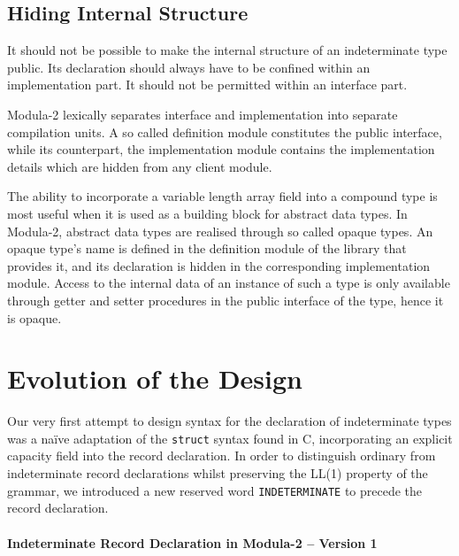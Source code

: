\documentclass[10pt,a4paper]{article}
\newcommand\sourcecaption[1]{\noindent\normalfont\small\textsf{#1}}
\begin{document}
\subsection{Hiding Internal Structure}

It should not be possible to make the internal structure of an indeterminate
type public. Its declaration should always have to be confined within an
implementation part. It should not be permitted within an interface part.\\

\par\noindent Modula-2 lexically separates interface and implementation into
separate compilation units. A so called definition module constitutes the
public interface, while its counterpart, the implementation module contains
the implementation details which are hidden from any client module.

The ability to incorporate a variable length array field into a compound
type is most useful when it is used as a building block for abstract
data types. In Modula-2, abstract data types are realised through so called
opaque types. An opaque type's name is defined in the definition module of
the library that provides it, and its declaration is hidden in the
corresponding implementation module. Access to the internal data of an
instance of such a type is only available through getter and setter
procedures in the public interface of the type, hence it is opaque.



\section{Evolution of the Design}

Our very first attempt to design syntax for the declaration of indeterminate
types was a na\"ive adaptation of the \verb|struct| syntax found in C,
incorporating an explicit capacity field into the record declaration. In order
to distinguish ordinary from indeterminate record declarations whilst
preserving the LL(1) property of the grammar, we introduced a new reserved word
\verb|INDETERMINATE| to precede the record declaration. 

\paragraph{\sourcecaption{Indeterminate Record Declaration in Modula-2
-- Version 1}}~
\end{document}
